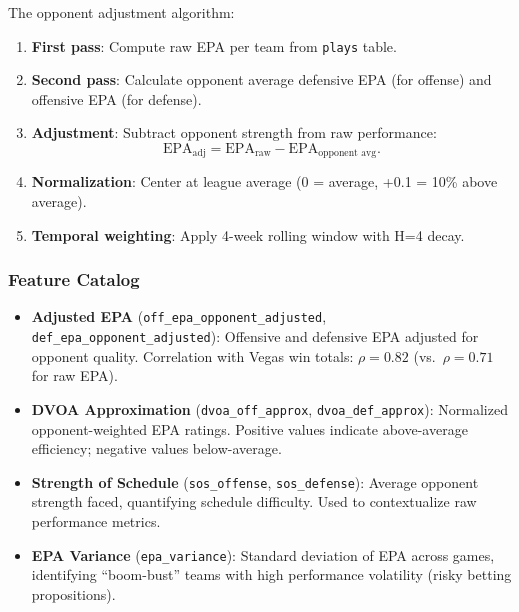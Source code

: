 The opponent adjustment algorithm:
\begin{enumerate}
  \item \textbf{First pass}: Compute raw EPA per team from \texttt{plays} table.
  \item \textbf{Second pass}: Calculate opponent average defensive EPA (for offense) and offensive EPA (for defense).
  \item \textbf{Adjustment}: Subtract opponent strength from raw performance:
  \begin{equation}
    \text{EPA}_{\text{adj}} = \text{EPA}_{\text{raw}} - \text{EPA}_{\text{opponent avg}}.
    \label{eq:dvoa-approx}
  \end{equation}
  \item \textbf{Normalization}: Center at league average (0 = average, +0.1 = 10\% above average).
  \item \textbf{Temporal weighting}: Apply 4-week rolling window with H=4 decay.
\end{enumerate}

\subsubsection{Feature Catalog}

\begin{itemize}
  \item \textbf{Adjusted EPA} (\texttt{off\_epa\_\allowbreak opponent\_adjusted}, \texttt{def\_epa\_\allowbreak opponent\_adjusted}): Offensive and defensive EPA adjusted for opponent quality. Correlation with Vegas win totals: $\rho = 0.82$ (vs.\ $\rho = 0.71$ for raw EPA).

  \item \textbf{DVOA Approximation} (\texttt{dvoa\_off\_approx}, \texttt{dvoa\_def\_approx}): Normalized opponent-weighted EPA ratings. Positive values indicate above-average efficiency; negative values below-average.

  \item \textbf{Strength of Schedule} (\texttt{sos\_offense}, \texttt{sos\_defense}): Average opponent strength faced, quantifying schedule difficulty. Used to contextualize raw performance metrics.

  \item \textbf{EPA Variance} (\texttt{epa\_variance}): Standard deviation of EPA across games, identifying ``boom-bust'' teams with high performance volatility (risky betting propositions).
\end{itemize}


